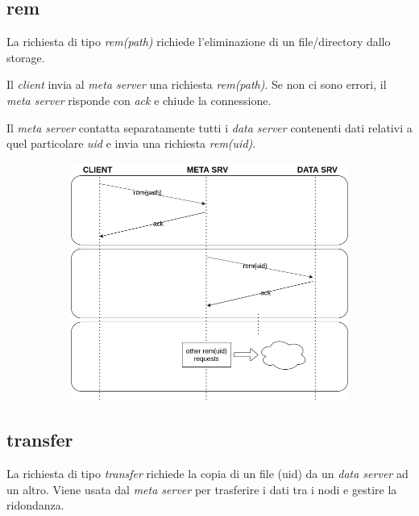 \documentclass{article}
\begin{document}
\subsection{rem}

La richiesta di tipo \textit{rem(path)} richiede l'eliminazione di un file/directory dallo storage.

Il \textit{client} invia al \textit{meta server} una richiesta \textit{rem(path)}. Se non ci sono errori, il \textit{meta server} risponde con \textit{ack} e chiude la connessione.

Il \textit{meta server} contatta separatamente tutti i \textit{data server} contenenti dati relativi a quel particolare \textit{uid} e invia una richiesta \textit{rem(uid)}.  

\begin{figure}[H]
	\centering
	\begin{subfigure}{0.80\linewidth}
		\includegraphics[width=\linewidth]{../diagrams/requests/rem_request.png}
	\end{subfigure}
\end{figure}



\subsection{transfer}

La richiesta di tipo \textit{transfer} richiede la copia di un file (uid) da un \textit{data server} ad un altro. Viene usata dal \textit{meta server} per trasferire i dati tra i nodi e gestire la ridondanza.
\end{document}
